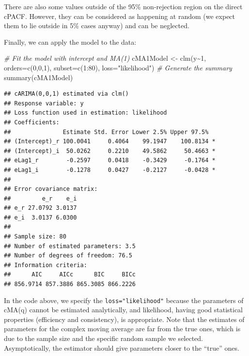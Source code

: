 \documentclass[
]{book}
\newenvironment{Shaded}{\begin{snugshade}}{\end{snugshade}}
\newcommand{\AttributeTok}[1]{\textcolor[rgb]{0.77,0.63,0.00}{#1}}
\newcommand{\CommentTok}[1]{\textcolor[rgb]{0.56,0.35,0.01}{\textit{#1}}}
\newcommand{\DecValTok}[1]{\textcolor[rgb]{0.00,0.00,0.81}{#1}}
\newcommand{\FunctionTok}[1]{\textcolor[rgb]{0.00,0.00,0.00}{#1}}
\newcommand{\NormalTok}[1]{#1}
\newcommand{\OtherTok}[1]{\textcolor[rgb]{0.56,0.35,0.01}{#1}}
\newcommand{\SpecialCharTok}[1]{\textcolor[rgb]{0.00,0.00,0.00}{#1}}
\newcommand{\StringTok}[1]{\textcolor[rgb]{0.31,0.60,0.02}{#1}}
\begin{document}
There are also some values outside of the 95\% non-rejection region on the direct cPACF. However, they can be considered as happening at random (we expect them to lie outside in 5\% cases anyway) and can be neglected.

Finally, we can apply the model to the data:

\begin{Shaded}
\begin{Highlighting}[]
\CommentTok{\# Fit the model with intercept and MA(1)}
\NormalTok{cMA1Model }\OtherTok{\textless{}{-}} \FunctionTok{clm}\NormalTok{(y}\SpecialCharTok{\textasciitilde{}}\DecValTok{1}\NormalTok{, }\AttributeTok{orders=}\FunctionTok{c}\NormalTok{(}\DecValTok{0}\NormalTok{,}\DecValTok{0}\NormalTok{,}\DecValTok{1}\NormalTok{),}
                 \AttributeTok{subset=}\FunctionTok{c}\NormalTok{(}\DecValTok{1}\SpecialCharTok{:}\DecValTok{80}\NormalTok{), }\AttributeTok{loss=}\StringTok{"likelihood"}\NormalTok{)}
\CommentTok{\# Generate the summary}
\FunctionTok{summary}\NormalTok{(cMA1Model)}
\end{Highlighting}
\end{Shaded}

\begin{verbatim}
## cARIMA(0,0,1) estimated via clm()
## Response variable: y
## Loss function used in estimation: likelihood
## Coefficients:
##               Estimate Std. Error Lower 2.5% Upper 97.5%  
## (Intercept)_r 100.0041     0.4064    99.1947    100.8134 *
## (Intercept)_i  50.0262     0.2210    49.5862     50.4663 *
## eLag1_r        -0.2597     0.0418    -0.3429     -0.1764 *
## eLag1_i        -0.1278     0.0427    -0.2127     -0.0428 *
## 
## Error covariance matrix:
##         e_r    e_i
## e_r 27.0792 3.0137
## e_i  3.0137 6.0300
## 
## Sample size: 80
## Number of estimated parameters: 3.5
## Number of degrees of freedom: 76.5
## Information criteria:
##      AIC     AICc      BIC     BICc 
## 856.9714 857.3886 865.3085 866.2226
\end{verbatim}

In the code above, we specify the \texttt{loss="likelihood"} because the parameters of cMA(q) cannot be estimated analytically, and likelihood, having good statistical properties (efficiency and consistency), is appropriate. Note that the estimates of parameters for the complex moving average are far from the true ones, which is due to the sample size and the specific random sample we selected. Asymptotically, the estimator should give parameters closer to the ``true'' ones.
\end{document}
